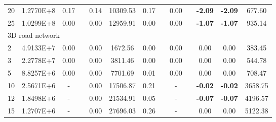 {\begin{longtable}{@{}llccccccccccc@{}}
\multicolumn{1}{l|}{20} & \multicolumn{1}{l|}{1.2770E+8}  & 0.17 & \multicolumn{1}{c|}{}    & 0.14 & \multicolumn{1}{c|}{10309.53} & 0.17 & \multicolumn{1}{c|}{}    & 0.00 & \multicolumn{1}{c|}{}    & \textbf{-2.09}  & \textbf{-2.09}  & 677.60  \\
\multicolumn{1}{l|}{25} & \multicolumn{1}{l|}{1.0299E+8}  & 0.00 & \multicolumn{1}{c|}{}    & 0.00 & \multicolumn{1}{c|}{12959.91} & 0.00 & \multicolumn{1}{c|}{}    & 0.00 & \multicolumn{1}{c|}{}    & \textbf{-1.07}  & \textbf{-1.07}  & 935.14  \\ \hline
\multicolumn{13}{l}{3D road network}                                                                                                                                                                                                                 \\ \hline
\multicolumn{1}{l|}{2}  & \multicolumn{1}{l|}{4.9133E+7}  & 0.00 & \multicolumn{1}{c|}{}    & 0.00 & \multicolumn{1}{c|}{1672.56}  & 0.00 & \multicolumn{1}{c|}{}    & 0.00 & \multicolumn{1}{c|}{}    & 0.00            & 0.00            & 383.45  \\
\multicolumn{1}{l|}{3}  & \multicolumn{1}{l|}{2.2778E+7}  & 0.00 & \multicolumn{1}{c|}{}    & 0.00 & \multicolumn{1}{c|}{3811.46}  & 0.00 & \multicolumn{1}{c|}{}    & 0.00 & \multicolumn{1}{c|}{}    & 0.00            & 0.00            & 544.78  \\
\multicolumn{1}{l|}{5}  & \multicolumn{1}{l|}{8.8257E+6}  & 0.00 & \multicolumn{1}{c|}{}    & 0.00 & \multicolumn{1}{c|}{7701.69}  & 0.01 & \multicolumn{1}{c|}{}    & 0.00 & \multicolumn{1}{c|}{}    & 0.00            & 0.00            & 708.47  \\
\multicolumn{1}{l|}{10} & \multicolumn{1}{l|}{2.5671E+6}  & -    & \multicolumn{1}{c|}{}    & 0.00 & \multicolumn{1}{c|}{17506.87} & 0.21 & \multicolumn{1}{c|}{}    & -    & \multicolumn{1}{c|}{}    & \textbf{-0.02}  & \textbf{-0.02}  & 3658.75 \\
\multicolumn{1}{l|}{12} & \multicolumn{1}{l|}{1.8498E+6}  & -    & \multicolumn{1}{c|}{}    & 0.00 & \multicolumn{1}{c|}{21534.91} & 0.05 & \multicolumn{1}{c|}{}    & -    & \multicolumn{1}{c|}{}    & \textbf{-0.07}  & \textbf{-0.07}  & 4196.57 \\
\multicolumn{1}{l|}{15} & \multicolumn{1}{l|}{1.2707E+6}  & -    & \multicolumn{1}{c|}{}    & 0.00 & \multicolumn{1}{c|}{27696.03} & 0.26 & \multicolumn{1}{c|}{}    & -    & \multicolumn{1}{c|}{}    & 0.00            & 0.00            & 5122.38 \\

\end{longtable}}
